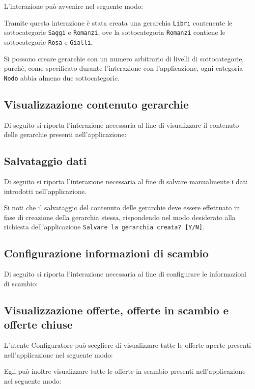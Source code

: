 L'interazione può avvenire nel seguente modo:

Tramite questa interazione è stata creata una gerarchia \texttt{Libri} contenente le sottocategorie \texttt{Saggi} e \texttt{Romanzi}, ove la sottocategoria \texttt{Romanzi} contiene le sottocategorie \texttt{Rosa} e \texttt{Gialli}. 

Si possono creare gerarchie con un numero arbitrario di livelli di sottocategorie, purché, come specificato durante l'interazione con l'applicazione, ogni categoria \texttt{Nodo} abbia almeno due sottocategorie.


\subsection{Visualizzazione contenuto gerarchie}
Di seguito si riporta l'interazione necessaria al fine di visualizzare il contenuto delle gerarchie presenti nell'applicazione:


\subsection{Salvataggio dati}
Di seguito si riporta l'interazione necessaria al fine di salvare manualmente i dati introdotti nell'applicazione.

Si noti che il salvataggio del contenuto delle gerarchie deve essere effettuato in fase di creazione della gerarchia stessa, rispondendo nel modo desiderato alla richiesta dell'applicazione \texttt{Salvare la gerarchia creata? [Y/N]}.


\subsection{Configurazione informazioni di scambio}
Di seguito si riporta l'interazione necessaria al fine di configurare le informazioni di scambio:


\subsection{Visualizzazione offerte, offerte in scambio e offerte chiuse}
L'utente Configuratore può scegliere di visualizzare tutte le offerte aperte presenti nell'applicazione nel seguente modo:


Egli può inoltre visualizzare tutte le offerte in scambio presenti nell'applicazione nel seguente modo:


